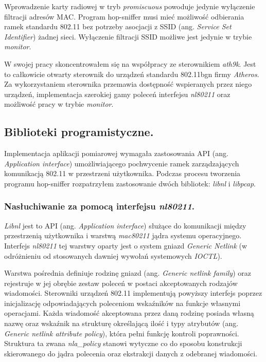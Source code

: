 Wprowadzenie karty radiowej w tryb \emph{promiscuous} powoduje jedynie wyłączenie filtracji adresów MAC. Program hop-sniffer musi mieć możliwość odbierania ramek standardu 802.11 bez potrzeby asocjacji z SSID (ang. \emph{Service Set Identifier}) żadnej sieci. Wyłączenie filtracji SSID możliwe jest jedynie w trybie \emph{monitor}.

W swojej pracy skoncentrowałem się na współpracy ze sterownikiem \emph{ath9k}. Jest to całkowicie otwarty sterownik do urządzeń standardu 802.11bgn firmy \emph{Atheros}. Za wykorzystaniem sterownika przemawia dostępność wspieranych przez niego urządzeń, implementacja szerokiej gamy poleceń interfejsu \emph{nl80211} oraz możliwość pracy w trybie \emph{monitor}.

\subsection{Biblioteki programistyczne.}

Implementacja aplikacji pomiarowej wymagała zastosowania API (ang. \emph{Application interface}) umożliwiającego pochwycenie ramek zarządzających komunikacją 802.11 w przestrzeni użytkownika. Podczas procesu tworzenia programu hop-sniffer rozpatrzyłem zastosowanie dwóch bibliotek: \emph{libnl} i \emph{libpcap}.

\subsubsection{Nasłuchiwanie za pomocą interfejsu \emph{nl80211}.}

\emph{Libnl} jest to API (ang. \emph{Application interface}) służące do komunikacji między przestrzenią użytkownika i warstwą \emph{mac80211} jądra systemu operacyjnego. Interfejs \emph{nl80211} tej warstwy oparty jest o system gniazd \emph{Generic Netlink} (w odróżnieniu od stosowanych dawniej wywołań systemowych \emph{IOCTL}).  

Warstwa pośrednia definiuje rodzinę gniazd (ang. \emph{Generic netlink family}) oraz rejestruje w jej obrębie zestaw poleceń w postaci akceptowanych rodzajów wiadomości. Sterowniki urządzeń 802.11 implementują powyższy interfejs poprzez inicjalizację odpowiadających poleceniom wskaźników na funkcje własnymi operacjami. Każda wiadomość akceptowana przez daną rodzinę posiada własną nazwę oraz wskaźnik na strukturę określającą ilość i typy atrybutów (ang. \emph{Generic netlink attribute policy}), która pełni funkcję kontroli poprawności. Struktura ta zwana \emph{nla\_policy} stanowi wytyczne co do sposobu konstrukcji skierowanego do jądra polecenia oraz ekstrakcji danych z odebranej wiadomości.


